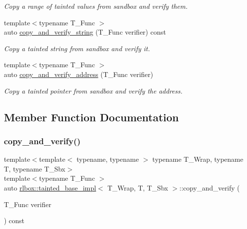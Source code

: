 \begin{DoxyCompactItemize}
$$\begin{DoxyCompactList}\small\item\em Copy a range of tainted values from sandbox and verify them. \end{DoxyCompactList}\item 
{\footnotesize template$<$typename T\+\_\+\+Func $>$ }\\auto \hyperlink{classrlbox_1_1tainted__base__impl_aa377cc4d0ea6768ada5032234ac89aab}{copy\+\_\+and\+\_\+verify\+\_\+string} (T\+\_\+\+Func verifier) const
\begin{DoxyCompactList}\small\item\em Copy a tainted string from sandbox and verify it. \end{DoxyCompactList}\item 
{\footnotesize template$<$typename T\+\_\+\+Func $>$ }\\auto \hyperlink{classrlbox_1_1tainted__base__impl_ad34419b3444d0bf37e25ecf7d37fbe0b}{copy\+\_\+and\+\_\+verify\+\_\+address} (T\+\_\+\+Func verifier)
\begin{DoxyCompactList}\small\item\em Copy a tainted pointer from sandbox and verify the address. \end{DoxyCompactList}\end{DoxyCompactItemize}


\subsection{Member Function Documentation}
\mbox{\label{classrlbox_1_1tainted__base__impl_a701759aedd637f48cc97a0e6ada1c8a6}} 
\subsubsection{\texorpdfstring{copy\+\_\+and\+\_\+verify()}{copy\_and\_verify()}}
{\footnotesize\ttfamily template$<$template$<$ typename, typename $>$ typename T\+\_\+\+Wrap, typename T, typename T\+\_\+\+Sbx$>$ \\
template$<$typename T\+\_\+\+Func $>$ \\
auto \hyperlink{classrlbox_1_1tainted__base__impl}{rlbox\+::tainted\+\_\+base\+\_\+impl}$<$ T\+\_\+\+Wrap, T, T\+\_\+\+Sbx $>$\+::copy\+\_\+and\+\_\+verify (\begin{DoxyParamCaption}\item[{T\+\_\+\+Func}]{verifier }\end{DoxyParamCaption}) const\hspace{0.3cm}{\ttfamily [inline]}}



